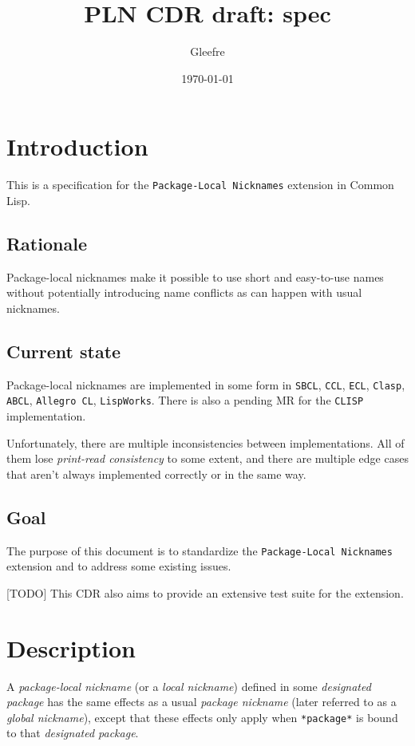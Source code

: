 \documentclass[11pt]{article}
\author{Gleefre}
\date{\today}
\title{PLN CDR draft: spec}
\begin{document}
\maketitle

\section{Introduction}
\label{sec:org9e3b8a9}
This is a specification for the \texttt{Package-Local Nicknames} extension in Common Lisp.
\subsection{Rationale}
\label{sec:org52c15a0}
Package-local nicknames make it possible to use short and easy-to-use names
without potentially introducing name conflicts as can happen with usual nicknames.
\subsection{Current state}
\label{sec:orge0dc4e1}
Package-local nicknames are implemented in some form in \texttt{SBCL}, \texttt{CCL}, \texttt{ECL},
\texttt{Clasp}, \texttt{ABCL}, \texttt{Allegro CL}, \texttt{LispWorks}. There is also a pending MR for the
\texttt{CLISP} implementation.

Unfortunately, there are multiple inconsistencies between implementations. All of
them lose \emph{print-read consistency} to some extent, and there are multiple edge
cases that aren't always implemented correctly or in the same way.
\subsection{Goal}
\label{sec:org4088f74}
The purpose of this document is to standardize the \texttt{Package-Local Nicknames}
extension and to address some existing issues.

[TODO] This CDR also aims to provide an extensive test suite for the extension.
\section{Description}
\label{sec:org562c795}
A \emph{package-local nickname} (or a \emph{local nickname}) defined in some \emph{designated
package} has the same effects as a usual \emph{package nickname} (later referred to as a
\emph{global nickname}), except that these effects only apply when \texttt{*package*} is bound
to that \emph{designated package}.
\end{document}
